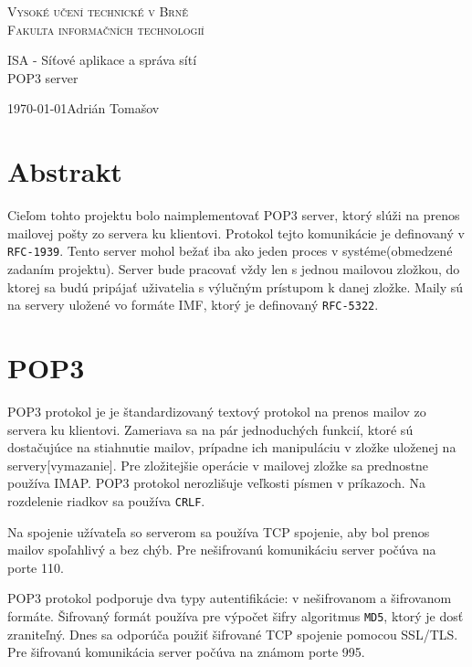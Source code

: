 \documentclass[a4paper, 11pt]{article}
\begin{document}
\begin{center}
\thispagestyle{empty}
\Huge
\textsc{Vysoké učení technické v Brně\\
\huge Fakulta informačních technologií\\}

\LARGE ISA - Síťové aplikace a správa sítí\\
\Huge POP3 server
\end{center}
{\LARGE \today \hfill Adrián Tomašov}
\pagebreak

\tableofcontents
\pagebreak

\setcounter{page}{1}


\section{Abstrakt}
Cieľom tohto projektu bolo naimplementovať POP3 server, ktorý slúži na prenos mailovej pošty zo servera ku klientovi. Protokol tejto komunikácie je definovaný v {\tt RFC-1939}. Tento server mohol bežať iba ako jeden proces v systéme(obmedzené zadaním projektu). Server bude pracovať vždy len s jednou mailovou zložkou, do ktorej sa budú pripájať uživatelia s výlučným prístupom k danej zložke. Maily sú na servery uložené vo formáte IMF, ktorý je definovaný {\tt RFC-5322}.



\section{POP3}
POP3 protokol je je  štandardizovaný textový protokol na prenos mailov zo servera ku klientovi. Zameriava sa na pár jednoduchých funkcií, ktoré sú dostačujúce na stiahnutie mailov, prípadne ich manipuláciu v zložke uloženej na servery[vymazanie]. Pre zložitejšie operácie v mailovej zložke sa prednostne používa IMAP. POP3 protokol nerozlišuje veľkosti písmen v príkazoch. Na rozdelenie riadkov sa používa {\tt CRLF}.

Na spojenie užívateľa so serverom sa používa TCP spojenie, aby bol prenos mailov spoľahlivý a bez chýb. Pre nešifrovanú komunikáciu server počúva na porte 110.

POP3 protokol podporuje dva typy autentifikácie: v nešifrovanom a šifrovanom formáte. Šifrovaný formát používa pre výpočet šifry algoritmus {\tt MD5}, ktorý je dosť zraniteľný. Dnes sa odporúča použiť šifrované TCP spojenie pomocou SSL/TLS. Pre šifrovanú komunikácia server počúva na známom porte 995. 
\end{document}
